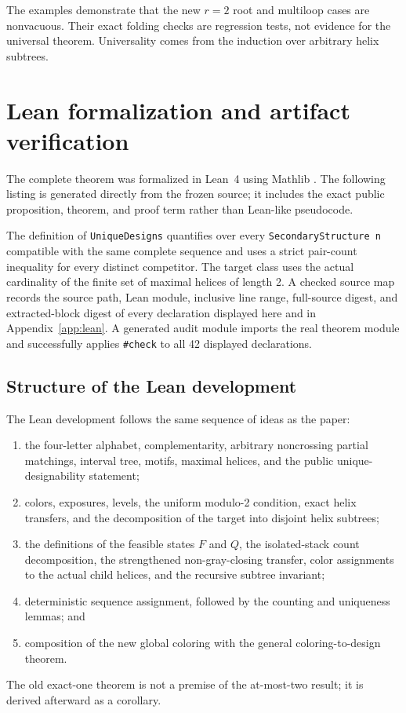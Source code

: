 \documentclass[11pt]{article}
\begin{document}
The examples demonstrate that the new $r=2$ root and multiloop cases are nonvacuous.  Their exact folding checks are regression tests, not evidence for the universal theorem.  Universality comes from the induction over arbitrary helix subtrees.

\clearpage
\section{Lean formalization and artifact verification}
\label{sec:formal}

The complete theorem was formalized in Lean~4 \citep{lean4} using Mathlib \citep{mathlib2020}.  The following listing is generated directly from the frozen source; it includes the exact public proposition, theorem, and proof term rather than Lean-like pseudocode.



The definition of \texttt{UniqueDesigns} quantifies over every \texttt{SecondaryStructure n} compatible with the same complete sequence and uses a strict pair-count inequality for every distinct competitor.  The target class uses the actual cardinality of the finite set of maximal helices of length 2.  A checked source map records the source path, Lean module, inclusive line range, full-source digest, and extracted-block digest of every declaration displayed here and in Appendix~\ref{app:lean}.  A generated audit module imports the real theorem module and successfully applies \texttt{\#check} to all 42 displayed declarations.

\subsection{Structure of the Lean development}

The Lean development follows the same sequence of ideas as the paper:
\begin{enumerate}
\item the four-letter alphabet, complementarity, arbitrary noncrossing partial matchings, interval tree, motifs, maximal helices, and the public unique-designability statement;
\item colors, exposures, levels, the uniform modulo-2 condition, exact helix transfers, and the decomposition of the target into disjoint helix subtrees;
\item the definitions of the feasible states $F$ and $Q$, the isolated-stack count decomposition, the strengthened non-gray-closing transfer, color assignments to the actual child helices, and the recursive subtree invariant;
\item deterministic sequence assignment, followed by the counting and uniqueness lemmas; and
\item composition of the new global coloring with the general coloring-to-design theorem.
\end{enumerate}
The old exact-one theorem is not a premise of the at-most-two result; it is derived afterward as a corollary.
\end{document}

